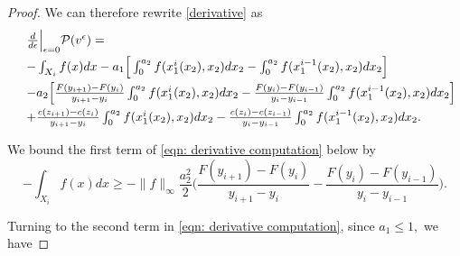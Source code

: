 \documentclass[10pt,a4paper]{amsart}
\begin{document}
\begin{proof}
 We can therefore rewrite \eqref{derivative} as 
\begin{equation}\label{eqn: derivative computation}
\begin{array}{ll}
         &\frac{d}{d\epsilon}\Big|_{\epsilon=0} \mathcal P(v^\epsilon)  =\vspace{3pt}\\
         &-\int_{X_i}f(x)dx -a_1\Big[\int_0^{a_2} f(x^i_1(x_2),x_2)dx_2-\int_0^{a_2} f(x_1^{i-1}(x_2),x_2)dx_2\Big] \vspace{3pt}\\
&-a_2\Big[\frac{F(y_{i+1})-F(y_i)}{y_{i+1}-y_{i}} \int_0^{a_2} f(x^i_1(x_2),x_2)dx_2 - \frac{F(y_{i})-F(y_{i-1})}{y_{i}-y_{i-1}}\int_0^{a_2} f(x_1^{i-1}(x_2),x_2)dx_2\Big]      \vspace{3pt}\\
&+     \frac{c(z_{i+1}) -c(z_{i})}{y_{i+1}-y_{i}}\int_0^{a_2} f(x^i_1(x_2),x_2)dx_2 -\frac{c(z_{i}) -c(z_{i-1})}{y_{i}-y_{i-1}}\int_0^{a_2} f(x_1^{i-1}(x_2),x_2)dx_2. 
\end{array}
\end{equation}



We bound the first term of \eqref{eqn: derivative computation} below by 
\begin{equation}\label{X_i mass bound}
-\int_{X_i}f(x)dx\ge -\|f\|_\infty\frac{a_2^2}{2}\Big(\frac{F(y_{i+1})-F(y_i)}{y_{i+1}-y_i}-\frac{F(y_i)-F(y_{i-1})}{y_i-y_{i-1}}\Big).
\end{equation}

Turning to the second term in \eqref{eqn: derivative computation}, since $a_1\le1,$ we have


\end{proof}
\end{document}
